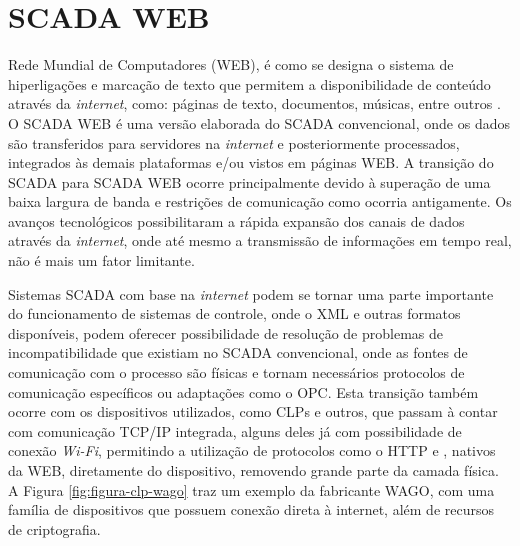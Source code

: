     \begin{figure}[!h]
    \end{figure}
    
\section{SCADA WEB}
\label{sec:scadaweb}

Rede Mundial de Computadores (\gls{WEB}), é como se designa o sistema de hiperligações e marcação de texto que permitem a disponibilidade de conteúdo através da \textit{internet}, como: páginas de texto, documentos, músicas, entre outros \cite{W3C}. O \gls{SCADA} \gls{WEB} é uma versão elaborada do SCADA convencional, onde os dados são transferidos para servidores na \textit{internet} e posteriormente processados, integrados às demais plataformas e/ou vistos em páginas WEB. A transição do SCADA para \gls{SCADA} \gls{WEB} ocorre principalmente devido à superação de uma baixa largura de banda e restrições de comunicação como ocorria antigamente. Os avanços tecnológicos possibilitaram a rápida expansão dos canais de dados através da \textit{internet}, onde até mesmo a transmissão de informações em tempo real, não é mais um fator limitante. \cite{ScadaWebSimp}

Sistemas \gls{SCADA} com base na \textit{internet} podem se tornar uma parte importante do funcionamento de sistemas de controle, onde o \gls{XML} e outras formatos disponíveis, podem oferecer possibilidade de resolução de problemas de incompatibilidade que existiam no \gls{SCADA} convencional, onde as fontes de comunicação com o processo são físicas e tornam necessários protocolos de comunicação específicos ou adaptações como o \gls{OPC}. Esta transição também ocorre com os dispositivos utilizados, como \glspl{CLP} e outros, que passam à contar com comunicação \gls{TCP/IP} integrada, alguns deles já com possibilidade de conexão \textit{Wi-Fi}, permitindo a utilização de protocolos como o \gls{HTTP} e , nativos da \gls{WEB}, diretamente do dispositivo, removendo grande parte da camada física. A Figura \ref{fig:figura-clp-wago} traz um exemplo da fabricante WAGO, com uma família de dispositivos que possuem conexão direta à internet, além de recursos de criptografia.

